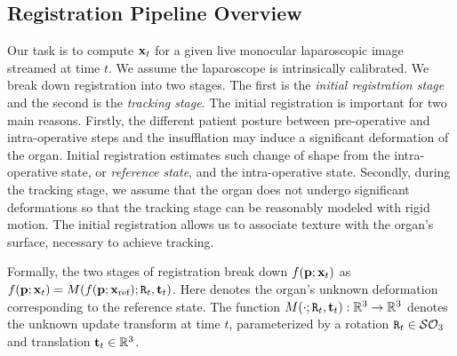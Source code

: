 \subsection{Registration Pipeline Overview}
\label{sec:globalOverview}
Our task is to compute $\mathbf{x}_t$ for a given live monocular laparoscopic image streamed at time $t$. We assume the laparoscope is intrinsically calibrated.
We break down registration into two stages. The first is the \textit{initial registration stage} and the second is the \emph{tracking stage}. 
The initial registration is important for two main reasons. Firstly, the different patient posture between pre-operative and intra-operative steps and the insufflation may induce a significant deformation of the organ. Initial registration estimates such change of shape from the intra-operative state, or \emph{reference state}, and the intra-operative state. 
Secondly, during the tracking stage, we assume that the organ does not undergo significant deformations so that the tracking stage can be reasonably modeled with rigid motion.  The initial registration allows us to associate texture with the organ's surface, necessary to achieve tracking.

Formally, the two stages of registration break down $f(\mathbf{p};\mathbf{x}_t)$ as $f(\vet{p};\vet{x}_{t})=M(f(\vet{p};\xref);\mat{R}_{t},\vet{t}_{t})$. Here \xref denotes the organ's unknown deformation corresponding to the reference state.
The function $M(\cdot;\mat{R}_{t},\vet{t}_{t}):\mathbb{R}^3\rightarrow \mathbb{R}^3$ denotes the unknown update transform at time $t$, parameterized by a rotation $\mat{R}_{t}\in \mathcal{SO}_{3}$ and translation $\mathbf{t}_{t}\in \mathbb{R}^3$.

